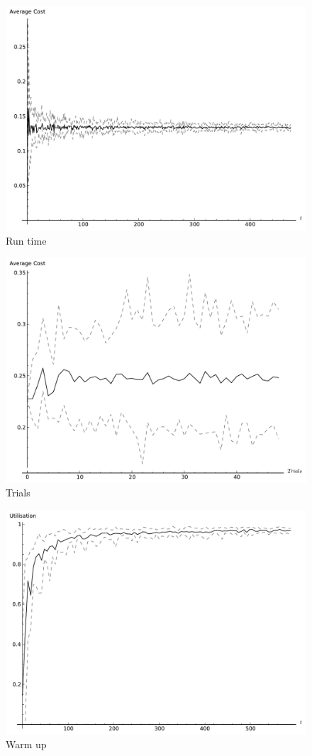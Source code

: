 \documentclass[12pt]{article}
\begin{document}
\begin{figure}[!hbtp]
    \begin{center}
        \includegraphics[width=.8\textwidth]{Images/Run_Time.pdf}
    \end{center}
    \caption{Run time}\label{runtime}
\end{figure}

\begin{figure}[!hbtp]
    \begin{center}
        \includegraphics[width=.8\textwidth]{Images/Trials.pdf}
    \end{center}
    \caption{Trials}\label{trials}
\end{figure}

\begin{figure}[!hbtp]
    \begin{center}
        \includegraphics[width=.8\textwidth]{Images/Warm_up.pdf}
    \end{center}
    \caption{Warm up}\label{warmup}
\end{figure}
\end{document}
